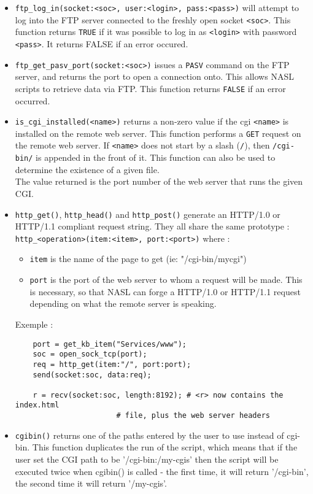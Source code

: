\documentclass{article}
\begin{document}
\begin{itemize}
\item \verb+ftp_log_in(socket:<soc>, user:<login>, pass:<pass>)+ will
attempt to log into the FTP server connected to the freshly open socket
\verb+<soc>+. This function returns \verb+TRUE+ if it was possible to
log in as \verb+<login>+ with password \verb+<pass>+. It returns FALSE
if an error occured.

\item \verb+ftp_get_pasv_port(socket:<soc>)+ issues a \verb+PASV+
command on the FTP server, and returns the port to open a connection
onto. This allows NASL scripts to retrieve data via FTP.
This function returns \verb+FALSE+ if an error occurred.

\item \verb+is_cgi_installed(<name>)+ returns a non-zero value if the
cgi \verb+<name>+ is installed on the remote web server. This
function performs a \verb+GET+ request on the remote web server.
If \verb+<name>+ does not start by a slash (\verb+/+), then
\verb+/cgi-bin/+ is appended in the front of it. This function
can also be used to determine the existence of a given file.\\
The value returned is the port number of the web server that
runs the given CGI.

\item \verb+http_get()+, \verb+http_head()+ and \verb+http_post()+ generate
an HTTP/1.0 or HTTP/1.1 compliant request string. They all share the
same prototype :\\
\indent\verb+http_<operation>(item:<item>, port:<port>)+
where :
\begin{itemize}
\item \verb+item+ is the name of the page to get (ie: "/cgi-bin/mycgi")
\item \verb+port+ is the port of the web server to whom a request will be
made. This is necessary, so that NASL can forge a HTTP/1.0 or HTTP/1.1
request depending on what the remote server is speaking.
\end{itemize}
Exemple :
\begin{verbatim}
	port = get_kb_item("Services/www");
	soc = open_sock_tcp(port);
	req = http_get(item:"/", port:port);
	send(socket:soc, data:req);

	r = recv(socket:soc, length:8192); # <r> now contains the index.html
					   # file, plus the web server headers
\end{verbatim}

\item \verb+cgibin()+ returns one of the paths entered by the user to use
instead of cgi-bin. This function duplicates the run of the script, 
which means that if the user set the CGI path to be '/cgi-bin:/my-cgis'
then the script will be executed twice when cgibin() is called - the first
time, it will return '/cgi-bin', the second time it will return
'/my-cgis'.
\end{itemize}
\end{document}
